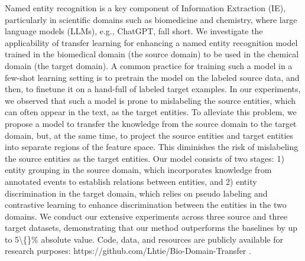 Named entity recognition is a key component of Information Extraction (IE), particularly in scientific domains such as biomedicine and chemistry, where large language models (LLMs), e.g., ChatGPT, fall short. We investigate the applicability of transfer learning for enhancing a named entity recognition model trained in the biomedical domain (the source domain) to be used in the chemical domain (the target domain). A common practice for training such a model in a few-shot learning setting is to pretrain the model on the labeled source data, and then, to finetune it on a hand-full of labeled target examples. In our experiments, we observed that such a model is prone to mislabeling the source entities, which can often appear in the text, as the target entities. To alleviate this problem, we propose a model to transfer the knowledge from the source domain to the target domain, but, at the same time, to project the source entities and target entities into separate regions of the feature space. This diminishes the risk of mislabeling the source entities as the target entities. Our model consists of two stages: 1) entity grouping in the source domain, which incorporates knowledge from annotated events to establish relations between entities, and 2) entity discrimination in the target domain, which relies on pseudo labeling and contrastive learning to enhance discrimination between the entities in the two domains. We conduct our extensive experiments across three source and three target datasets, demonstrating that our method outperforms the baselines by up to 5\textbackslash\{\}\% absolute value. Code, data, and resources are publicly available for research purposes: https://github.com/Lhtie/Bio-Domain-Transfer .